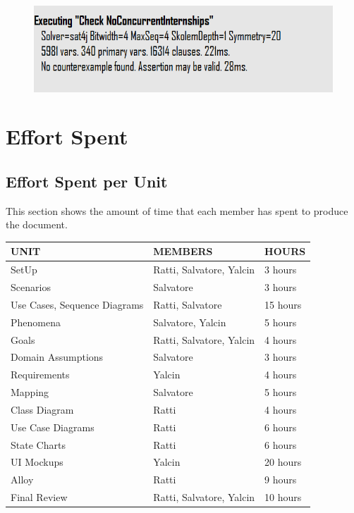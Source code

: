 \documentclass{article}
\begin{document}
\begin{figure}[H]
    \centering
    \includegraphics[width=1\textwidth]{figures/alloy/assertion.png}
    \centering
\end{figure}
\section{Effort Spent}
\subsection{Effort Spent per Unit}
This section shows the amount of time that each member has spent to produce the document. 

\begin{center}
    \begin{tabular}{|m{5cm}|m{5cm}|m{2cm}|}
        \hline
        \textbf{UNIT} & \textbf{MEMBERS} & \textbf{HOURS} \\ \hline
        SetUp & Ratti, Salvatore, Yalcin & 3 hours \\ \hline
        Scenarios & Salvatore & 3 hours \\ \hline
        Use Cases, Sequence Diagrams & Ratti, Salvatore & 15 hours \\ \hline
        Phenomena & Salvatore, Yalcin  & 5 hours \\ \hline
        Goals & Ratti, Salvatore, Yalcin & 4 hours \\ \hline
        Domain Assumptions & Salvatore & 3 hours \\ \hline
        Requirements & Yalcin & 4 hours \\ \hline
        Mapping & Salvatore & 5 hours \\ \hline
        Class Diagram & Ratti & 4 hours \\ \hline
        Use Case Diagrams & Ratti & 6 hours \\ \hline
        State Charts & Ratti & 6 hours \\ \hline
        UI Mockups & Yalcin & 20 hours \\ \hline
        Alloy & Ratti & 9 hours \\ \hline
        Final Review & Ratti, Salvatore, Yalcin & 10 hours\\ \hline
    \end{tabular}
\end{center}
\end{document}

